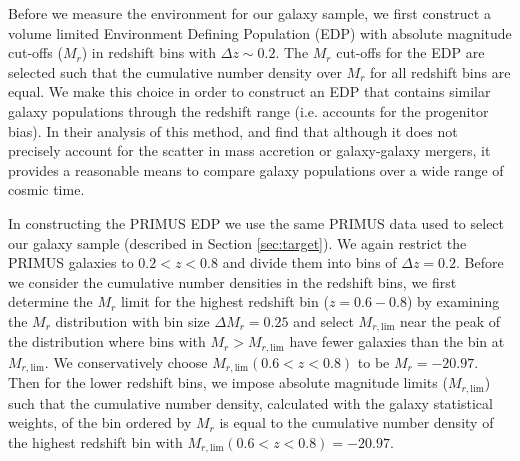 \documentclass{emulateapj}
\begin{document}
Before we measure the environment for our galaxy sample, we first
construct a volume limited Environment Defining Population (EDP) with
absolute magnitude cut-offs ($M_{r}$) in redshift bins with $\Delta z
\sim 0.2$. The $M_{r}$ cut-offs for the EDP are selected such that the
cumulative number density over $M_{r}$ for all redshift bins are
equal.  We make this choice in order to construct an EDP that contains
similar galaxy populations through the redshift range (i.e. accounts
for the progenitor bias). In their analysis of this method,
\cite{Behroozi:2013aa} and \cite{Leja:2013aa} find that although it
does not precisely account for the scatter in mass accretion or
galaxy-galaxy mergers, it provides a reasonable means to compare
galaxy populations over a wide range of cosmic time.

In constructing the PRIMUS EDP we use the same PRIMUS data used to select our galaxy sample (described in Section \ref{sec:target}). We again restrict the PRIMUS galaxies to $0.2 < z < 0.8$ and divide them into bins of $\Delta z = 0.2$. Before we consider the cumulative number densities in the redshift bins, we first determine the $M_r$ limit for the highest redshift bin ($z = 0.6-0.8$) by examining the $M_{r}$ distribution with bin size $\Delta M_{r} = 0.25$ and select $M_{r,\mathrm{lim}}$ near the peak of the distribution where bins with $M_{r} > M_{r,\mathrm{lim}}$ have fewer galaxies than the bin at $M_{r, \mathrm{lim}}$. We conservatively choose $M_{r, \mathrm{lim}}(0.6 < z < 0.8)$ to be $M_{r} = -20.97$. Then for the lower redshift bins, we impose absolute magnitude limits ($M_{r,\mathrm{lim}}$) such that the cumulative number density, calculated with the galaxy statistical weights, of the bin ordered by $M_{r}$ is equal to the cumulative number density of the highest redshift bin with $M_{r, \mathrm{lim}}(0.6 < z < 0.8) = -20.97$. 
\end{document}
